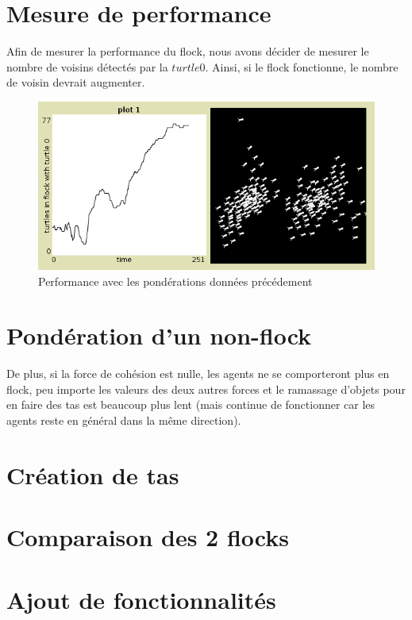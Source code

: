 \documentclass{article}
\begin{document}
\section{Mesure de performance}

Afin de mesurer la performance du flock, nous avons décider de mesurer le nombre de voisins détectés par la $turtle 0$. Ainsi, si le flock fonctionne, le nombre de voisin devrait augmenter.

\begin{figure}[h]
	\begin{center}
		\includegraphics[scale=0.5]{img/performance}
		\caption{Performance avec les pondérations données précédement}
		\label{fig:performance}
	\end{center}
\end{figure}

\section{Pondération d'un non-flock}
De plus, si la force de cohésion est nulle, les agents ne se comporteront plus en flock, peu importe les valeurs des deux autres forces et le ramassage d'objets pour en faire des tas est beaucoup plus lent (mais continue de fonctionner car les agents reste en général dans la même direction).

\section{Création de tas}

\section{Comparaison des 2 flocks}

\section{Ajout de fonctionnalités}
\end{document}
